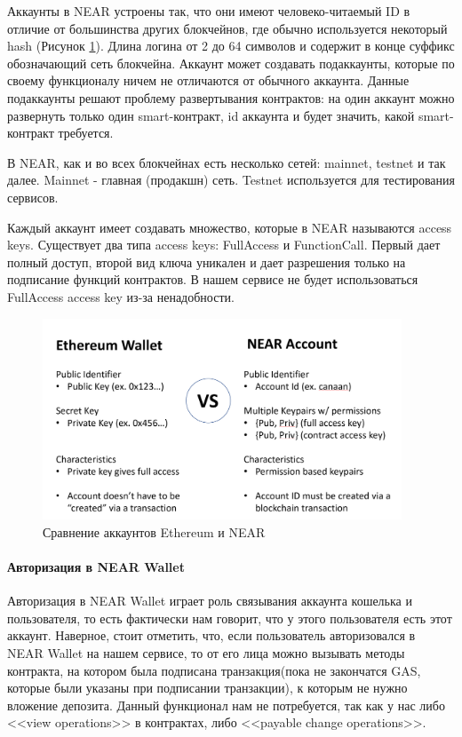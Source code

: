 Аккаунты в NEAR \cite{nearaccounts} устроены так, что они имеют человеко-читаемый ID в отличие от большинства других блокчейнов, где обычно используется некоторый hash (Рисунок {\color{blue} \ref{fig.eth_near_cmp}}). Длина логина от 2 до 64 символов и содержит в конце суффикс обозначающий сеть блокчейна. Аккаунт может создавать подаккаунты, которые по своему функционалу ничем не отличаются от обычного аккаунта. Данные подаккаунты решают проблему развертывания контрактов: на один аккаунт можно развернуть только один smart-контракт, id аккаунта и будет значить, какой smart-контракт требуется.

\begin{definition}
    В NEAR, как и во всех блокчейнах есть несколько сетей: mainnet, testnet и так далее. Mainnet - главная (продакшн) сеть. Testnet используется для тестирования сервисов.
\end{definition}

Каждый аккаунт имеет создавать множество, которые в NEAR называются access keys. Существует два типа access keys: FullAccess и FunctionCall. Первый дает полный доступ, второй вид ключа уникален и дает разрешения только на подписание функций контрактов. В нашем сервисе не будет использоваться FullAccess access key из-за ненадобности.

\begin{figure}
    \centering
    \includegraphics[height=60mm]{fig/eth_near_cmp.png}
    \caption{Сравнение аккаунтов Ethereum и NEAR}
    \label{fig.eth_near_cmp}
\end{figure}

\paragraph{Авторизация в NEAR Wallet}

Авторизация в NEAR Wallet играет роль связывания аккаунта кошелька и пользователя, то есть фактически нам говорит, что у этого пользователя есть этот аккаунт. Наверное, стоит отметить, что, если пользователь авторизовался в NEAR Wallet на нашем сервисе, то от его лица можно вызывать методы контракта, на котором была подписана транзакция(пока не закончатся GAS, которые были указаны при подписании транзакции), к которым не нужно вложение депозита. Данный функционал нам не потребуется, так как у нас либо <<view operations>> в контрактах, либо <<payable change operations>>.


